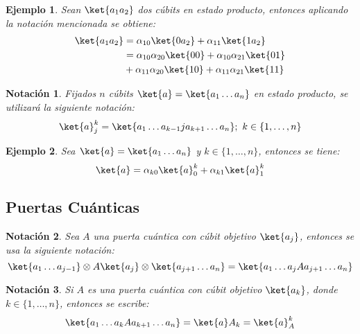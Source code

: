\documentclass[10pt,conference,a4paper]{IEEEtran}
\newtheorem{notacion}{Notación}[subsection]
\newtheorem{ejemplo}{Ejemplo}
\begin{document}
    \begin{ejemplo}
        Sean $\ket{a_1a_2}$ dos cúbits en estado producto, entonces aplicando la notación mencionada se obtiene:
        \begin{align*}
            \ket{a_1a_2}&=\alpha_{10}\ket{0a_2}+\alpha_{11}\ket{1a_2}\\
            &=\alpha_{10}\alpha_{20}\ket{00}+\alpha_{10}\alpha_{21}\ket{01}\\
            &+\alpha_{11}\alpha_{20}\ket{10}+\alpha_{11}\alpha_{21}\ket{11}
        \end{align*}
    \end{ejemplo}

    \begin{notacion}
        Fijados $n$ cúbits $\ket{a}=\ket{a_1\ldots a_n}$ en estado producto, se utilizará la siguiente notación:
        \begin{equation}
            \ket{a}_j^k=\ket{a_1\ldots a_{k-1}ja_{k+1}\ldots a_n};\ k\in\{1,\ldots, n\}
            \label{not:2}
        \end{equation}
    \end{notacion}

    \begin{ejemplo}
        Sea $\ket{a}=\ket{a_1\ldots a_n}$ y $k\in\{1,\ldots,n\}$, entonces se tiene:
        $$\ket{a}=\alpha_{k0}\ket{a}_0^k+\alpha_{k1}\ket{a}_1^k$$
    \end{ejemplo}


    \subsection{Puertas Cuánticas}

    \begin{notacion}
        Sea $A$ una puerta cuántica con cúbit objetivo $\ket{a_j}$, entonces se usa la siguiente notación:
        \begin{equation}
            \ket{a_1\ldots a_{j-1}}\otimes A\ket{a_j}\otimes \ket{a_{j+1}\ldots a_n}=\ket{a_1\ldots a_{j}Aa_{j+1}\ldots a_n}
            \label{not:3}
        \end{equation}
    \end{notacion}

    \begin{notacion}
        Si $A$ es una puerta cuántica con cúbit objetivo $\ket{a_k}$, donde $k\in\{1,\ldots, n\}$, entonces se escribe:
        \begin{equation}
            \ket{a_1\ldots a_k A a_{k+1}\ldots a_n}=\ket{a}A_k=\ket{a}_A^k
            \label{not:4}
        \end{equation}
    \end{notacion}
\end{document}
